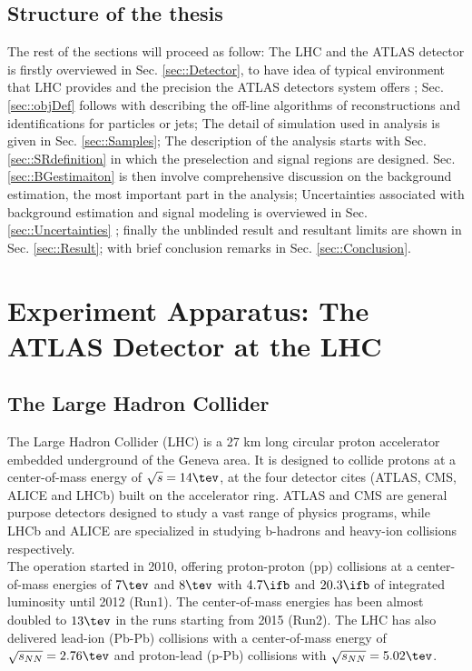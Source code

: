 \subsection{Structure of the thesis}
The rest of the sections will proceed as follow: 
The LHC and the ATLAS detector is firstly overviewed in Sec. \ref{sec::Detector}, 
to have idea of typical environment that LHC provides and 
the precision the ATLAS detectors system offers ; 
Sec. \ref{sec::objDef} follows with describing the off-line algorithms of reconstructions and identifications for particles or jets; 
The detail of simulation used in analysis is given in Sec. \ref{sec::Samples}; 
The description of the analysis starts with Sec. \ref{sec::SRdefinition} in which the preselection and signal regions are designed. Sec. \ref{sec::BGestimaiton} is then involve comprehensive discussion on the background estimation, the most important part in the analysis;
Uncertainties associated with background estimation and signal modeling is overviewed in Sec. \ref{sec::Uncertainties}
; finally the unblinded result and resultant limits are shown in Sec. \ref{sec::Result}; 
with brief conclusion remarks in Sec. \ref{sec::Conclusion}.


\section{Experiment Apparatus:  The ATLAS Detector at the LHC}

\subsection{The Large Hadron Collider} 
The Large Hadron Collider (LHC) \cite{LHC} is a 27 km long circular proton accelerator embedded underground of the Geneva area.
It is designed to collide protons at a center-of-mass energy of $\sqrt{s} = 14 \tev$, at the four detector cites (ATLAS\cite{ATLAS_exp}, CMS\cite{CMS}, ALICE\cite{ALICE} and LHCb\cite{LHCb}) built on the accelerator ring. ATLAS and CMS are general purpose detectors designed to study a vast range of physics programs, while LHCb and ALICE are specialized in studying b-hadrons and heavy-ion collisions respectively. \\

The operation started in 2010, offering proton-proton (pp) collisions at a center-of-mass energies of $7\tev$ and $8\tev$ with $4.7\ifb$ and $20.3\ifb$ of integrated luminosity until 2012 (Run1). The center-of-mass energies has been almost doubled to $13\tev$
in the runs starting from 2015 (Run2). The LHC has also delivered lead-ion (Pb-Pb) collisions with a center-of-mass energy of $\sqrt{s_{NN}} = 2.76\tev$ and proton-lead (p-Pb) collisions with $\sqrt{s_{NN}} = 5.02\tev$.

